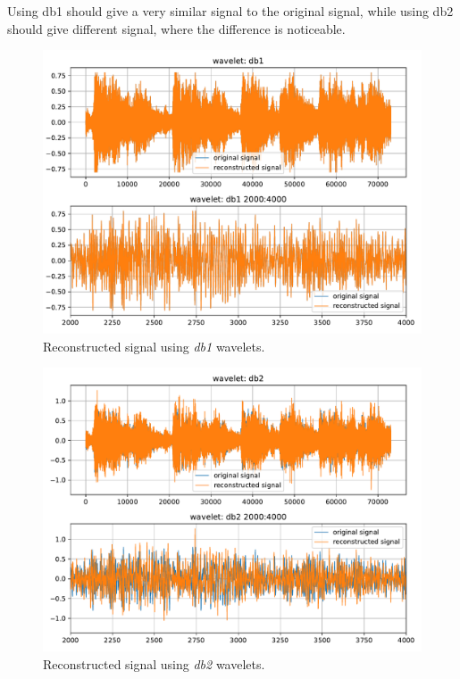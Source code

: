 Using db1 should give a very similar signal to the original signal, while using db2 should give different signal, where the difference is noticeable.


\begin{figure}[H]
    \centering
    \includegraphics[width=\textwidth]{./img/problem1-2-reconstructed-signal-db1.pdf}
    \caption{Reconstructed signal using \textit{db1} wavelets.}
    \label{fig:y_reconstructed_with_db1}
\end{figure}

\begin{figure}[H]
    \centering
    \includegraphics[width=\textwidth]{./img/problem1-2-reconstructed-signal-db2.pdf}
    \caption{Reconstructed signal using \textit{db2} wavelets.}
    \label{fig:y_reconstructed_with_db2}
\end{figure}


